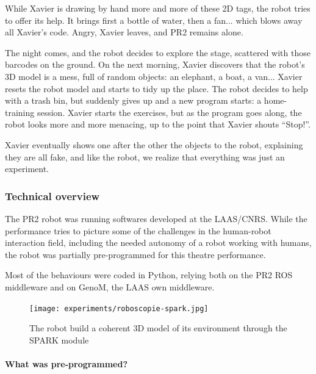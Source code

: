 While Xavier is drawing by hand more and more of these 2D tags, the robot tries
to offer its help. It brings first a bottle of water, then a fan... which blows
away all Xavier's code. Angry, Xavier leaves, and PR2 remains alone.

The night comes, and the robot decides to explore the stage, scattered with
those barcodes on the ground. On the next morning, Xavier discovers that the
robot's 3D model is a mess, full of random objects: an elephant, a boat, a
van... Xavier resets the robot model and starts to tidy up the place. The robot
decides to help with a trash bin, but suddenly gives up and a new program
starts: a home-training session. Xavier starts the exercises, but as the
program goes along, the robot looks more and more menacing, up to the point
that Xavier shouts ``Stop!''.

Xavier eventually shows one after the other the objects to the robot,
explaining they are all fake, and like the robot, we realize that everything
was just an experiment.

\subsubsection{Technical overview}

The PR2 robot was running softwares developed at the LAAS/CNRS. While the
performance tries to picture some of the challenges in the human-robot
interaction field, including the needed autonomy of a robot working with
humans, the robot was partially pre-programmed for this theatre performance.

Most of the behaviours were coded in Python, relying both on the PR2 ROS
middleware and on {\sc GenoM}, the LAAS own middleware.

\begin{figure}
    \centering
    \texttt{[image: experiments/roboscopie-spark.jpg]}
    \caption{The robot build a coherent 3D model of its environment through the
    SPARK module}
    \label{fig|spark-roboscopie}
\end{figure}

\paragraph{What was pre-programmed?}

